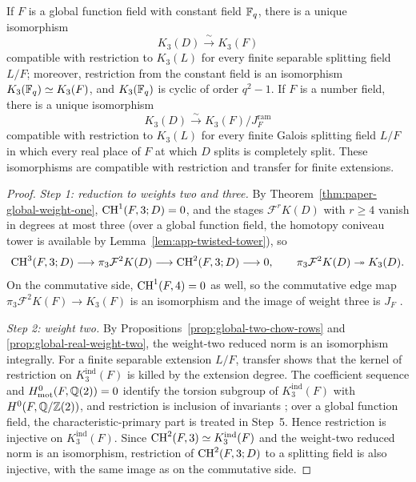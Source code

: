 \begin{theorem}\label{thm:global-k3}
If $F$ is a global function field with constant field $\mathbb F_q$, there is a unique isomorphism
\[
 K_3(D)\xrightarrow{\ \sim\ }K_3(F)
\]
compatible with restriction to $K_3(L)$ for every finite separable splitting field $L/F$; moreover, restriction from the constant field is an isomorphism $K_3(\mathbb F_q)\simeq K_3(F)$, and $K_3(\mathbb F_q)$ is cyclic of order $q^2-1$.
If $F$ is a number field, there is a unique isomorphism
\[
 K_3(D)\xrightarrow{\ \sim\ }K_3(F)/J_{F}^{\mathrm{ram}}
\]
compatible with restriction to $K_3(L)$ for every finite Galois splitting field $L/F$ in which every real place of $F$ at which $D$ splits is completely split.
These isomorphisms are compatible with restriction and transfer for finite extensions.
\end{theorem}
\begin{proof}
\emph{Step 1: reduction to weights two and three.}
By Theorem~\ref{thm:paper-global-weight-one}, $\operatorname{CH}^1(F,3;D)=0$, and the stages $\mathcal{F}^rK(D)$ with $r\ge4$ vanish in degrees at most three (over a global function field, the homotopy coniveau tower is available by Lemma~\ref{lem:app-twisted-tower}), so
\[
 \operatorname{CH}^3(F,3;D)\longrightarrow \pi_3 \mathcal{F}^2K(D)
   \longrightarrow \operatorname{CH}^2(F,3;D)\longrightarrow 0,\qquad
 \pi_3\mathcal{F}^2K(D)\twoheadrightarrow K_3(D).
\]
On the commutative side, $\operatorname{CH}^1(F,4)=0$ as well, so the commutative edge map $\pi_3\mathcal{F}^2K(F)\to K_3(F)$ is an isomorphism and the image of weight three is $J_F$ \cite[Corollary 6.1.4]{KahnLevine2010}.

\emph{Step 2: weight two.}
By Propositions~\ref{prop:global-two-chow-rows} and \ref{prop:global-real-weight-two}, the weight-two reduced norm is an isomorphism integrally.
For a finite separable extension $L/F$, transfer shows that the kernel of restriction on $K_3^{\mathrm{ind}}(F)$ is killed by the extension degree.
The coefficient sequence and $H^0_{\mathrm{mot}}(F,\mathbb Q(2))=0$ identify the torsion subgroup of $K_3^{\mathrm{ind}}(F)$ with $H^0(F,\mathbb Q/\mathbb Z(2))$, and restriction is inclusion of invariants \cite{Voevodsky}; over a global function field, the characteristic-primary part is treated in Step~5.
Hence restriction is injective on $K_3^{\mathrm{ind}}(F)$.
Since $\operatorname{CH}^2(F,3)\simeq K_3^{\mathrm{ind}}(F)$ and the weight-two reduced norm is an isomorphism, restriction of $\operatorname{CH}^2(F,3;D)$ to a splitting field is also injective, with the same image as on the commutative side.


\end{proof}
